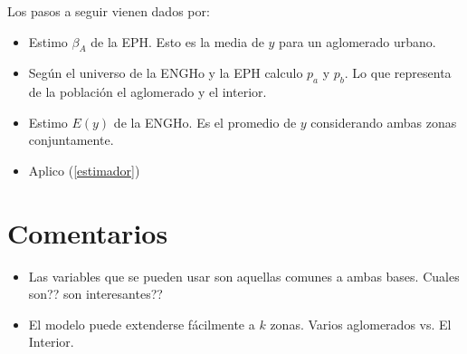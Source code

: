 \documentclass[11pt,spanish]{article}
\begin{document}
Los pasos a seguir vienen dados por:
\begin{itemize}
\item Estimo $\beta_{A}$ de la EPH. Esto es la media de $y$ para un aglomerado urbano.
\item Según el universo  de la ENGHo y la EPH calculo $p_{a}$ y $p_{b}$. Lo que representa de la población el aglomerado y el interior.
\item Estimo $E(y)$ de la ENGHo. Es el promedio de $y$ considerando ambas zonas conjuntamente.
\item Aplico (\ref{estimador})
\end{itemize}

\section{Comentarios}
\begin{itemize}
\item Las variables que se pueden usar son aquellas comunes a ambas bases. Cuales son?? son interesantes??
\item El modelo puede extenderse fácilmente a $k$ zonas. Varios aglomerados vs. El Interior.
\end{itemize}
\end{document}
